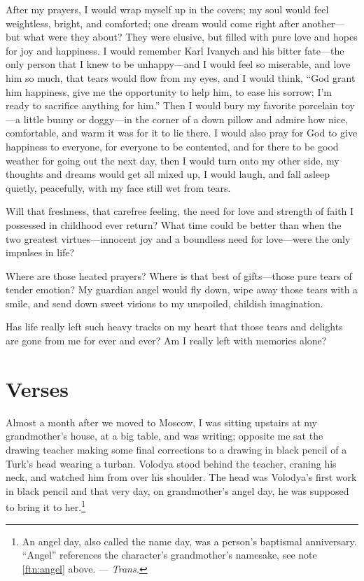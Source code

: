 After my prayers, I would wrap myself up in the covers; my soul would feel weightless, bright, and comforted; one dream would come right after another---but what were they about? They were elusive, but filled with pure love and hopes for joy and happiness. I would remember Karl Ivanych and his bitter fate---the only person that I knew to be unhappy---and I would feel so miserable, and love him so much, that tears would flow from my eyes, and I would think, ``God grant him happiness, give me the opportunity to help him, to ease his sorrow; I'm ready to sacrifice anything for him.'' Then I would bury my favorite porcelain toy---a little bunny or doggy---in the corner of a down pillow and admire how nice, comfortable, and warm it was for it to lie there. I would also pray for God to give happiness to everyone, for everyone to be contented, and for there to be good weather for going out the next day, then I would turn onto my other side, my thoughts and dreams would get all mixed up, I would laugh, and fall asleep quietly, peacefully, with my face still wet from tears.

Will that freshness, that carefree feeling, the need for love and strength of faith I possessed in childhood ever return? What time could be better than when the two greatest virtues---innocent joy and a boundless need for love---were the only impulses in life?

Where are those heated prayers? Where is that best of gifts---those pure tears of tender emotion? My guardian angel would fly down, wipe away those tears with a smile, and send down sweet visions to my unspoiled, childish imagination.

Has life really left such heavy tracks on my heart that those tears and delights are gone from me for ever and ever? Am I really left with memories alone?

\chapter{Verses} %

Almost a month after we moved to Moscow, I was sitting upstairs at my grandmother's house, at a big table, and was writing; opposite me sat the drawing teacher making some final corrections to a drawing in black pencil of a Turk's head wearing a turban. Volodya stood behind the teacher, craning his neck, and watched him from over his shoulder. The head was Volodya's first work in black pencil and that very day, on grandmother's angel day, he was supposed to bring it to her.\footnote{An angel day, also called the name day, was a person's baptismal anniversary. ``Angel'' references the character's grandmother's namesake, see note \ref{ftn:angel} above. --- \textit{Trans.}}

